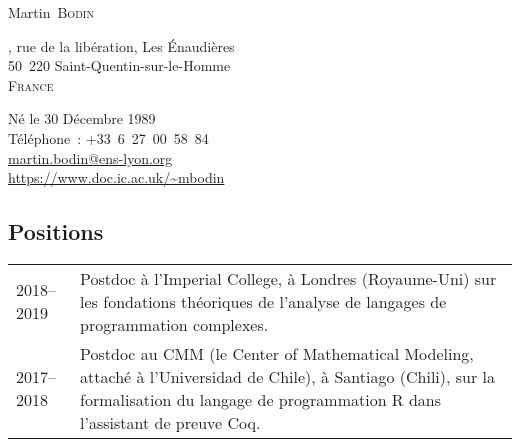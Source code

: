 \documentclass[12pt,a4paper]{article}
\makeatletter
\newcommand{\en}[1]{\foreignlanguage{english}{{#1}}}
\newcommand{\es}[1]{\foreignlanguage{spanish}{{#1}}}
\newcommand{\en}[1]{\foreignlanguage{english}{{#1}}}
\newcommand{\es}[1]{\foreignlanguage{spanish}{{#1}}}
\newenvironment{datecvsection}[1]%
               {\subsection*{#1}%
                 \noindent \begin{tabular}{@{}p{\annee}p{\texte}@{}}}
               {\end{tabular}}
\newcommand\familyName{\textsc}
\newcommand\placeName{}
\makeatother
\begin{document}
\pagestyle{empty}


\newlength{\annee}
\settowidth{\annee}{9999--9999}


\newlength{\texte}
\setlength{\texte}{\textwidth} \addtolength{\texte}{-\annee} 
	\addtolength{\texte}{-2\tabcolsep}

\begin{center} \Huge Martin~\familyName{Bodin} \end{center}

\parbox[c]{.5\textwidth}
{
  , rue de la libération,
  Les Énaudières \\
  50~220 Saint-Quentin-sur-le-Homme \\
  \textsc{France}
}
\parbox[c]{.55\textwidth}
{
\begin{flushright}
  Né le 30 Décembre 1989 \\
  \noindent Téléphone~: \mbox{+33 6 27 00 58 84} \\
  \url{martin.bodin@ens-lyon.org} \\
  \url{https://www.doc.ic.ac.uk/~mbodin}
\end{flushright}
}


\begin{datecvsection}{Positions}

    2018–2019 & Postdoc à l’\en{\placeName{Imperial College}}, à \placeName{Londres} (\placeName{Royaume-Uni}) sur les fondations théoriques de l’analyse de langages de programmation complexes. \\

    2017–2018 & Postdoc au \placeName{CMM} (le \en{\placeName{Center of Mathematical Modeling}}, attaché à l’\es{\placeName{Universidad de Chile}}), à \placeName{Santiago} (\placeName{Chili}), sur la formalisation du langage de programmation R dans l’assistant de preuve Coq. \\

\end{datecvsection}
\end{document}
